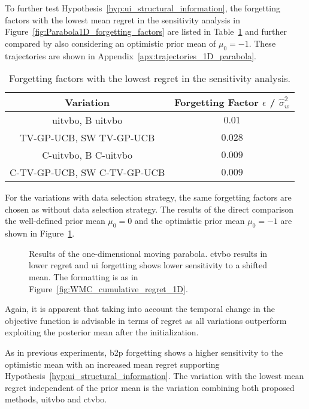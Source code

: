 To further test Hypothesis~\ref{hyp:ui_structural_information}, the forgetting factors with the lowest mean regret in the sensitivity analysis in Figure~\ref{fig:Parabola1D_forgetting_factors} are listed in Table~\ref{tab:1d} and further compared by also considering an optimistic prior mean of $\mu_0 = -1$. These trajectories are shown in Appendix~\ref{apx:trajectories_1D_parabola}.
\bgroup
\def\arraystretch{1.2}
\begin{table}[h]
\begin{center}
\begin{tabular}{ c || c}
\textbf{Variation} & \textbf{Forgetting Factor $\epsilon$ / $\hat{\sigma}_w^2$} \\\hline\hline
\gls{uitvbo}, B \gls{uitvbo}& $0.01$\\
TV-GP-UCB, SW TV-GP-UCB & $0.028$\\
C-\gls{uitvbo}, B C-\gls{uitvbo} & $0.009$ \\ 
C-TV-GP-UCB, SW C-TV-GP-UCB & $0.009$
\end{tabular}
\end{center}
\caption{Forgetting factors with the lowest regret in the sensitivity analysis.}
\label{tab:1d}
\end{table}
\egroup

For the variations with data selection strategy, the same forgetting factors are chosen as without data selection strategy. The results of the direct comparison the well-defined prior mean $\mu_0=0$ and the optimistic prior mean $\mu_0 = -1$ are shown in Figure~\ref{fig:Parabola1D_cumulative_regret}.
\begin{figure}[h!]
    \centering
    
    \caption[Results of the one-dimensional moving parabola.]{Results of the one-dimensional moving parabola. \gls{ctvbo} results in lower regret and \gls{ui} forgetting shows lower sensitivity to a shifted mean. The formatting is as in Figure~\ref{fig:WMC_cumulative_regret_1D}.}
    \label{fig:Parabola1D_cumulative_regret}
\end{figure}
Again, it is apparent that taking into account the temporal change in the objective function is advisable in terms of regret as all variations outperform exploiting the posterior mean after the initialization.

As in previous experiments, \gls{b2p} forgetting shows a higher sensitivity to the optimistic mean with an increased mean regret supporting Hypothesis~\ref{hyp:ui_structural_information}. The variation with the lowest mean regret independent of the prior mean is the variation combining both proposed methods, \gls{uitvbo} and \gls{ctvbo}.

